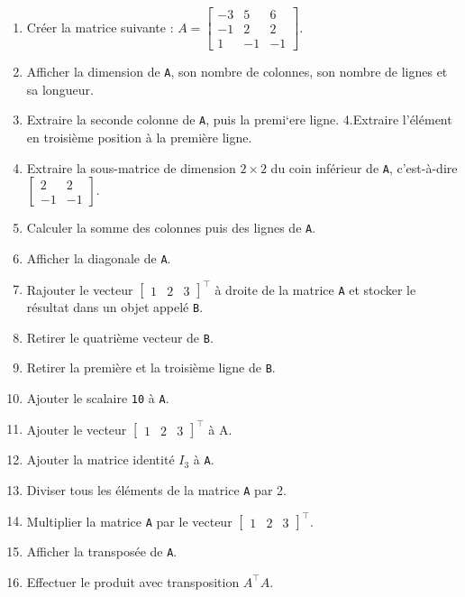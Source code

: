 \documentclass[12pt,]{book}
\providecommand{\tightlist}{%
  \setlength{\itemsep}{0pt}\setlength{\parskip}{0pt}}
\numberwithin{equation}{section}
\numberwithin{countremarque}{section}
\begin{document}
\begin{enumerate}
\def\labelenumi{\arabic{enumi}.}
\tightlist
\item
  Créer la matrice suivante :
  \(A = \begin{bmatrix} -3 & 5 & 6 \\ -1 & 2 & 2 \\ 1 & -1 & -1 \end{bmatrix}\).
\item
  Afficher la dimension de \texttt{A}, son nombre de colonnes, son
  nombre de lignes et sa longueur.
\item
  Extraire la seconde colonne de \texttt{A}, puis la premi`ere ligne.
  4.Extraire l'élément en troisième position à la première ligne.
\item
  Extraire la sous-matrice de dimension \(2\times 2\) du coin inférieur
  de \texttt{A}, c'est-à-dire
  \(\begin{bmatrix} 2 & 2 \\ -1 & -1 \end{bmatrix}\).
\item
  Calculer la somme des colonnes puis des lignes de \texttt{A}.
\item
  Afficher la diagonale de \texttt{A}.
\item
  Rajouter le vecteur \(\begin{bmatrix} 1 & 2 & 3\end{bmatrix}^\top\) à
  droite de la matrice \texttt{A} et stocker le résultat dans un objet
  appelé \texttt{B}.
\item
  Retirer le quatrième vecteur de \texttt{B}.
\item
  Retirer la première et la troisième ligne de \texttt{B}.
\item
  Ajouter le scalaire \texttt{10} à \texttt{A}.
\item
  Ajouter le vecteur \(\begin{bmatrix} 1 & 2 & 3\end{bmatrix}^\top\) à
  A.
\item
  Ajouter la matrice identité \(I_3\) à \texttt{A}.
\item
  Diviser tous les éléments de la matrice \texttt{A} par 2.
\item
  Multiplier la matrice \texttt{A} par le vecteur
  \(\begin{bmatrix} 1 & 2 & 3\end{bmatrix}^\top\).
\item
  Afficher la transposée de \texttt{A}.
\item
  Effectuer le produit avec transposition \(A^\top A\).
\end{enumerate}
\end{document}
